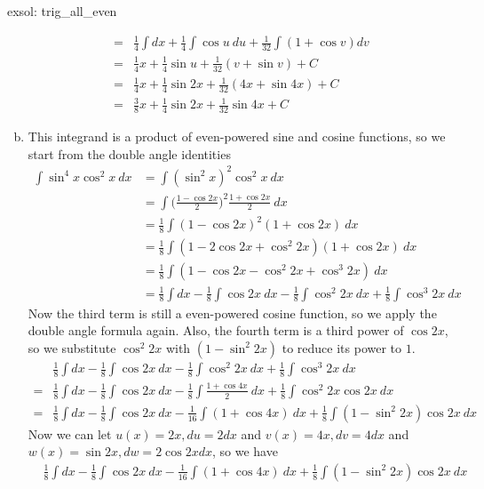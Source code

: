 \begin{exsol}[]{exsol: trig_all_even}
\begin{enumerate}[a)]
\begin{align*}
            =&\frac{1}{4}\int dx + \frac{1}{4}\int \cos u~du + \frac{1}{32}\int (1+\cos v) dv\\
            =&\frac{1}{4}x + \frac{1}{4} \sin u + \frac{1}{32}(v + \sin v) + C\\
            =&\frac{1}{4}x + \frac{1}{4} \sin 2x + \frac{1}{32}(4x + \sin 4x) + C\\
            =&\frac{3}{8}x + \frac{1}{4} \sin 2x + \frac{1}{32} \sin 4x + C
        \end{align*}
        \item This integrand is a product of even-powered sine and cosine functions, so we start from the double angle identities
        \begin{align*}
            \int \sin^4x \cos^2x~dx &= \int (\sin^2x)^2\cos^2x~dx\\
            &= \int \Big(\frac{1-\cos 2x}{2}\Big)^2\frac{1+\cos 2x}{2}~dx\\
            &= \frac{1}{8} \int (1-\cos 2x)^2(1+\cos 2x)~dx\\
            &= \frac{1}{8} \int (1-2\cos 2x + \cos^2 2x)(1+\cos 2x)~dx\\
            &= \frac{1}{8} \int (1 - \cos 2x - \cos^2 2x + \cos^3 2x)~dx\\
            &= \frac{1}{8} \int dx - \frac{1}{8} \int \cos 2x~ dx - \frac{1}{8} \int \cos^2 2x~dx + \frac{1}{8} \int \cos^3 2x~dx
        \end{align*}
        Now the third term is still a even-powered cosine function, so we apply the double angle formula again.  Also, the fourth term is a third power of $\cos 2x$, so we substitute $\cos^2 2x$ with $(1-\sin^2 2x)$ to reduce its power to $1$.
        \begin{align*}
            &\frac{1}{8} \int dx - \frac{1}{8} \int \cos 2x~ dx - \frac{1}{8} \int \cos^2 2x~dx + \frac{1}{8} \int \cos^3 2x~dx\\
            =&\frac{1}{8} \int dx - \frac{1}{8} \int \cos 2x~ dx - \frac{1}{8} \int \frac{1+\cos 4x}{2}~dx + \frac{1}{8} \int \cos^2 2x \cos 2x~dx\\
            =&\frac{1}{8} \int dx - \frac{1}{8} \int \cos 2x~ dx - \frac{1}{16} \int (1+\cos 4x)~dx + \frac{1}{8} \int (1-\sin^2 2x) \cos 2x~dx
        \end{align*}
        Now we can let $u(x) = 2x, du = 2dx$ and $v(x) = 4x, dv = 4dx$ and $w(x) = \sin 2x, dw = 2\cos 2x dx$, so we have
        \begin{align*}
            &\frac{1}{8} \int dx - \frac{1}{8} \int \cos 2x~ dx - \frac{1}{16} \int (1+\cos 4x)~dx + \frac{1}{8} \int (1-\sin^2 2x) \cos 2x~dx\\

\end{align*}
\end{enumerate}
\end{exsol}
